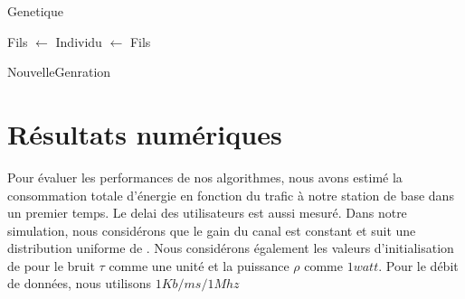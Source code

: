 \documentclass[runningheads]{llncs}
\begin{document}
\begin{algorithm}[H]
    \caption{Genetique}%
    \label{alg:genetic}
    \begin{algorithmic}[1]
                \State Fils $ \gets  $
                \State Individu $\gets $ Fils
                \EndIf{}
            \EndFor{}
        \EndWhile{}

    \State {}
    
    \end{algorithmic}
\end{algorithm}
\begin{algorithm}[H]
    \caption{NouvelleGenration}%
    \label{alg:ngeneration}
    \begin{algorithmic}[1]
    \State {}
    
    \end{algorithmic}
\end{algorithm}



\section{R\'esultats num\'eriques}
Pour évaluer les performances de nos algorithmes, nous avons estimé la 
consommation totale d'énergie en fonction du trafic à notre station de 
base dans un premier temps. Le delai des utilisateurs est aussi mesur\'e.
Dans notre simulation, nous considérons que le gain du canal est constant 
et suit une distribution uniforme de \cite{huang2016}.
Nous considérons également les valeurs d'initialisation de \cite{huang2016} 
pour le bruit $ \tau $ comme une unité et la puissance $ \rho $ comme 
$ 1 watt $. Pour le débit de données, nous utilisons $1Kb/ms/1Mhz$
\end{document}
